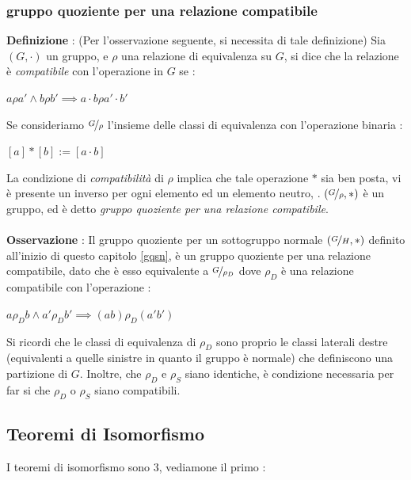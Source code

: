 \documentclass[12pt, letterpaper]{article}
\begin{document}
\subsubsection{gruppo quoziente per una relazione compatibile}   
\textbf{Definizione }: (Per l'osservazione seguente, si necessita di tale 
definizione) Sia \((G,\cdot)\) un gruppo, e \(\rho\) una relazione di equivalenza su \(G\), si dice che la relazione 
è \textit{compatibile} con l'operazione in \(G\) se : \begin{center}\(
    a\rho a'\land b\rho b'\implies a\cdot b\rho a'\cdot b'
\)\end{center}   
Se consideriamo \(\nicefrac{G}{\rho}\) l'insieme delle classi di equivalenza con l'operazione binaria :\begin{center}
    \([a]*[b]:=[a\cdot b]\)
\end{center}  
La condizione di \textit{compatibilità} di \(\rho\) implica che tale operazione \(*\) sia 
ben posta, vi è presente un inverso per ogni elemento ed un elemento neutro, . \((\nicefrac{G}{\rho},*)\) 
è un gruppo, ed è detto \textit{gruppo quoziente per una relazione compatibile}.
\\\hphantom{}\\\textbf{Osservazione }: Il gruppo quoziente per un sottogruppo normale \((\nicefrac{G}{H},*)\) definito all'inizio di 
questo capitolo \ref{gqsn}, è un gruppo quoziente per una relazione compatibile, dato che è esso equivalente 
a \(\nicefrac{G}{\rho_D}\) dove \(\rho_D\) è una relazione compatibile con l'operazione : \begin{center}
    \(a\rho_D b\land a'\rho_D b'\implies (ab)\rho_D (a'b')\)
\end{center}
Si ricordi che le classi di equivalenza di \(\rho_D\) sono proprio le classi laterali destre (equivalenti 
a quelle sinistre in quanto il gruppo è normale) che definiscono una partizione di \(G\). Inoltre, che \(\rho_D\) e \(\rho_S\)
siano identiche, è condizione 
necessaria per far si che \(\rho_D\) o \(\rho_S\)  siano compatibili.
\subsection{Teoremi di Isomorfismo}
I teoremi di isomorfismo sono 3, vediamone il primo :
\end{document}
